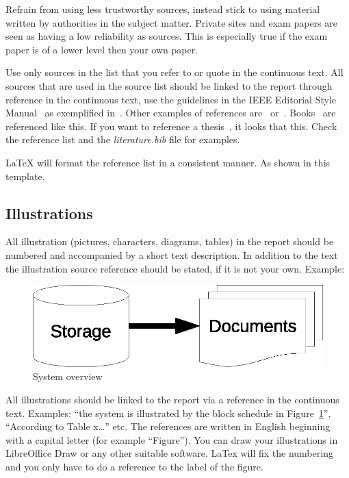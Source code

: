 Refrain from using less trustworthy sources, instead stick to using material
written by authorities in the subject matter. Private sites and exam papers are
seen as having a low reliability as sources. This is especially true if the exam
paper is of a lower level then your own paper.

Use only sources in the list that you refer to or quote in the continuous text.
All sources that are used in the source list should be linked to the report
through reference in the continuous text, use the guidelines in the  IEEE
Editorial Style Manual~\cite{ieeestylemanual} as exemplified
in~\cite{ieeesunipit}. Other examples of references
are~\cite{eriksson2001dynamic} or~\cite{lavassani2018combining}.
Books~\cite{brookshear2008computer} are referenced like this. If you want to
reference a thesis~\cite{forsstrom2014enabling}, it looks that this. Check the
reference list and the \emph{literature.bib} file for examples.

LaTeX will format the reference list in a consistent manner. As shown in this template.

\subsection{Illustrations}\label{subsec:illustrations}
All illustration (pictures, characters, diagrams, tables) in the report should
be numbered and accompanied by a short text description. In addition to the text
the illustration source reference should be stated, if it is not your own.
Example:
\begin{figure}[h]
    \centering
    \includegraphics{Pictures/Latex_figure1.eps}
    \caption{System overview}\label{fig:figure1}
\end{figure}

All illustrations should be linked to the report via a reference in the
continuous text. Examples: ``the system is illustrated by the block schedule in
Figure~\ref{fig:figure1}'', ``According to Table x\dots'' etc. The references are
written in English beginning with a capital letter (for example ``Figure''). You
can draw your illustrations in LibreOffice Draw or any other suitable software.
LaTex will fix the numbering and you only have to do a reference to the label of
the figure.

